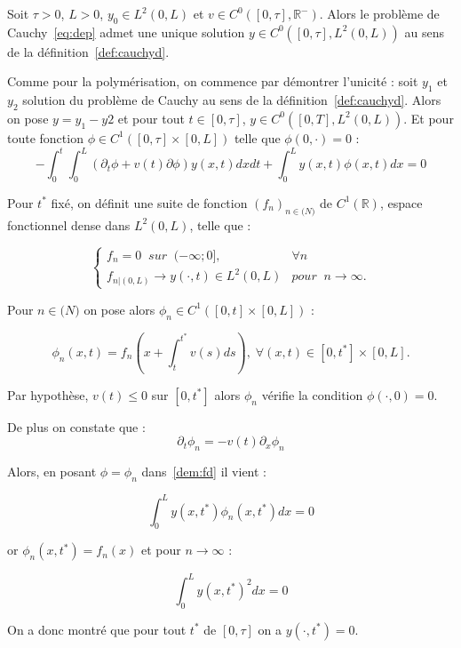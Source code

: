 \documentclass[a4paper]{article}
\begin{document}
\begin{theoreme}
	Soit $\tau >0$, $L>0$, $y_0 \in L^2(0,L)$ et $v \in C^0([0,\tau],\mathbb{R}^-)$.
	Alors le problème de Cauchy~\eqref{eq:dep} admet une unique solution $y \in C^0([0,\tau],L^2(0,L))$ au sens de la définition~\ref{def:cauchyd}.
\end{theoreme}

\begin{preuve}
	Comme pour la polymérisation, on commence par démontrer l'unicité : 
	soit $y_1$ et $y_2$ solution du problème de Cauchy au sens de la définition~\ref{def:cauchyd}. 
	Alors on pose $y=y_1-y2$ et pour tout $t \in [0,\tau]$, $y \in C^0([0,T],L^2(0,L))$.
	Et pour toute fonction $\phi \in C^1([0,\tau] \times [0,L])$ telle que $\phi (0,\cdot)=0$ :
\begin{equation}
	\label{dem:fd}
	-\int_0^t \int_0^L (\partial_t \phi +v(t)\partial \phi) y(x,t) dxdt 
			+ \int_0^L y(x,t) \phi (x,t) dx =0
\end{equation}

	Pour $t^*$ fixé, on définit une suite de fonction $(f_n)_{n \in \mathbb(N)}$ de $C^1(\mathbb{R})$, espace fonctionnel dense dans $L^2(0,L)$, telle que :
	
\[
\begin{cases}
	f_n =0 \; \; sur \; \; (-\infty;0], & \forall n \\
	f_{n|(0,L)} \to y(\cdot,t) \in L^2(0,L) & pour \; \;  n\rightarrow \infty.
\end{cases}
\]

Pour $n \in \mathbb(N)$ on pose alors $\phi_n \in C^1([0,t]\times [0,L])$ :

\[ \phi_n(x,t) = f_n(x + \int_t^{t^*} v(s)ds), \; \forall (x,t) \in [0,t^*]\times [0,L]. \]

Par hypothèse, $v(t) \leq 0$ sur $[0, t^*]$ alors $\phi_n$ vérifie la condition $\phi (\cdot, 0)=0$.

De plus on constate que :
\[ \partial_t \phi_n = -v(t) \partial_x \phi_n \]

Alors, en posant $\phi = \phi_n$ dans~\eqref{dem:fd} il vient :

\[ \int_0^L y(x,t^*) \phi_n (x,t^*) dx =0 \]

or $\phi_n (x,t^*) = f_n(x)$ et pour $n \rightarrow \infty$ :

\[ \int_0^L y(x,t^*)^2 dx =0 \]

On a donc montré que pour tout $t^*$ de $[0,\tau]$ on a $y(\cdot, t^*) =0 $.


	
\end{preuve}
\end{document}
